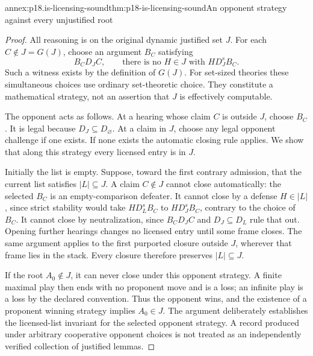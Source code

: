 \begin{annexitem}{annex:p18.is-licensing-sound}{thm:p18-is-licensing-sound}{An opponent strategy against every unjustified root}
\begin{proof}
All reasoning is on the original dynamic justified set \(J\).
For each \(C\notin J=G(J)\), choose an argument \(B_C\) satisfying
\[
 B_C D_J C,\qquad
 \text{there is no }H\in J\text{ with }H D_J^s B_C.
\]
Such a witness exists by the definition of \(G(J)\).
For set-sized theories these simultaneous choices use ordinary
set-theoretic choice. They constitute a mathematical strategy,
not an assertion that \(J\) is effectively computable.

The opponent acts as follows. At a hearing whose claim \(C\)
is outside \(J\), choose \(B_C\).
It is legal because \(D_J\subseteq D_\varnothing\).
At a claim in \(J\), choose any legal opponent challenge if
one exists. If none exists the automatic closing rule applies.
We show that along this strategy every licensed entry is in \(J\).

Initially the list is empty. Suppose, toward the first contrary
admission, that the current list satisfies \(|L|\subseteq J\).
A claim \(C\notin J\) cannot close automatically: the selected
\(B_C\) is an empty-comparison defeater.
It cannot close by a defense \(H\in |L|\), since strict stability
would take \(H D_L^sB_C\) to \(H D_J^sB_C\), contrary to the
choice of \(B_C\).
It cannot close by neutralization, since
\(B_CD_JC\) and \(D_J\subseteq D_L\) rule that out.
Opening further hearings changes no licensed entry until some
frame closes. The same argument applies to the first purported
closure outside \(J\), wherever that frame lies in the stack.
Every closure therefore preserves \(|L|\subseteq J\).

If the root \(A_0\notin J\), it can never close under this
opponent strategy. A finite maximal play then ends with no
proponent move and is a loss; an infinite play is a loss by
the declared convention. Thus the opponent wins, and the
existence of a proponent winning strategy implies \(A_0\in J\).
The argument deliberately establishes the licensed-list invariant
for the selected opponent strategy. A record produced under
arbitrary cooperative opponent choices is not treated as an
independently verified collection of justified lemmas.
\end{proof}
\end{annexitem}

